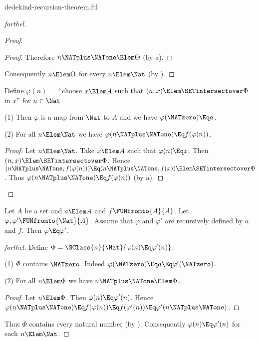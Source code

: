 \documentclass{stex}
\begin{document}
\begin{smodule}{dedekind-recursion-theorem.ftl}
\begin{proof}[forthel]
\begin{proof}
\begin{proof}
      Therefore $n \NATplus \NATone \Elem \Theta$ (by a).
    \end{proof}

    Consequently $n \Elem \Theta$ for every $n \Elem \Nat$ (by ).
  \end{proof}

  Define $\varphi(n) =$ ``choose $x \Elem A$ such that $(n, x) \Elem
  \SETintersectover \Phi$ in $x$'' for $n \in \Nat$.

  (1) Then $\varphi$ is a map from $\Nat$ to $A$ and we have
  $\varphi(\NATzero) \Eq a$.

  (2) For all $n \Elem \Nat$ we have $\varphi(n \NATplus \NATone) \Eq
  f(\varphi(n))$.
  \begin{proof}
    Let $n \Elem \Nat$.
    Take $x \Elem A$ such that $\varphi(n) \Eq x$.
    Then $(n, x) \Elem \SETintersectover \Phi$.
    Hence $(n \NATplus \NATone, f(\varphi(n))) \Eq (n \NATplus \NATone, f(x)) \Elem \SETintersectover \Phi$.
    Thus $\varphi(n \NATplus \NATone) \Eq f(\varphi(n))$ (by a).
  \end{proof}
\end{proof}

\begin{theorem}[forthel,title=Dedekind's Recursion Theorem: Uniqueness,id=dedekind_uniqueness]
  Let $A$ be a set and $a \Elem A$ and $f \FUNfromto{A}{A}$.
  Let $\varphi, \varphi' \FUNfromto{\Nat}{A}$.
  Assume that $\varphi$ and $\varphi'$ are recursively defined by $a$ and
  $f$.
  Then $\varphi \Eq \varphi'$.
\end{theorem}
\begin{proof}[forthel]
  Define $\Phi = \SClass{n}{\Nat}{\varphi(n) \Eq \varphi'(n)}$.

  (1) $\Phi$ contains $\NATzero$.
  Indeed $\varphi(\NATzero) \Eq a \Eq \varphi'(\NATzero)$.

  (2) For all $n \Elem \Phi$ we have $n \NATplus \NATone \Elem \Phi$.
  \begin{proof}
    Let $n \Elem \Phi$.
    Then $\varphi(n) \Eq \varphi'(n)$.
    Hence $\varphi(n \NATplus \NATone)
      \Eq f(\varphi(n))
      \Eq f(\varphi'(n))
      \Eq \varphi'(n \NATplus \NATone)$.
    \end{proof}

  Thus $\Phi$ contains every natural number (by ).
  Consequently $\varphi(n) \Eq \varphi'(n)$ for each $n \Elem \Nat$.
\end{proof}
\end{smodule}
\end{document}
